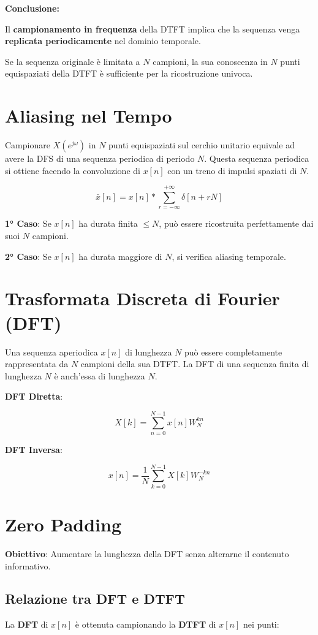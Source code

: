 \textbf{Conclusione:}

Il \textbf{campionamento in frequenza} della DTFT implica che la sequenza venga \textbf{replicata periodicamente} nel dominio temporale.

Se la sequenza originale è limitata a \(N\) campioni, la sua conoscenza in \(N\) punti equispaziati della DTFT è sufficiente per la ricostruzione univoca.


\section*{Aliasing nel Tempo}

Campionare \( X(e^{j\omega}) \) in \( N \) punti equispaziati sul cerchio unitario equivale ad avere la DFS di una sequenza periodica di periodo \( N \). Questa sequenza periodica si ottiene facendo la convoluzione di \( x[n] \) con un treno di impulsi spaziati di \( N \).

\[
\bar{x}[n] = x[n] * \sum_{r=-\infty}^{+\infty} \delta[n + rN]
\]

\textbf{1° Caso}: Se \( x[n] \) ha durata finita \( \leq N \), può essere ricostruita perfettamente dai suoi \( N \) campioni.

\textbf{2° Caso}: Se \( x[n] \) ha durata maggiore di \( N \), si verifica aliasing temporale.

\section*{Trasformata Discreta di Fourier (DFT)}

Una sequenza aperiodica \( x[n] \) di lunghezza \( N \) può essere completamente rappresentata da \( N \) campioni della sua DTFT. La DFT di una sequenza finita di lunghezza \( N \) è anch'essa di lunghezza \( N \).

\textbf{DFT Diretta}:

\[
X[k] = \sum_{n=0}^{N-1} x[n] W_N^{kn}
\]

\textbf{DFT Inversa}:

\[
x[n] = \frac{1}{N} \sum_{k=0}^{N-1} X[k] W_N^{-kn}
\]

\section{Zero Padding}

\textbf{Obiettivo}: Aumentare la lunghezza della DFT senza alterarne il contenuto informativo.

\subsection{Relazione tra DFT e DTFT}
La \textbf{DFT} di \( x[n] \) è ottenuta campionando la \textbf{DTFT} di \( x[n] \) nei punti:

